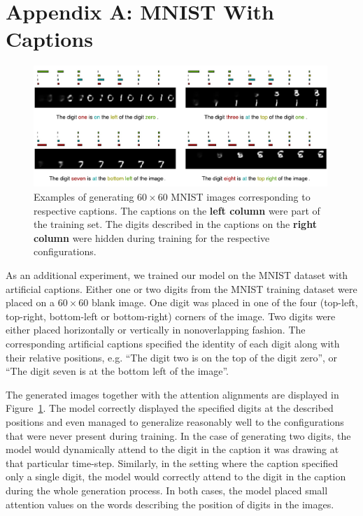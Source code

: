 

\section*{Appendix A: MNIST With Captions}

\begin{figure}[!t]
\captionsetup[subfigure]{labelformat=empty}
\begin{center}
\includegraphics[width=0.99\textwidth]{figures/new/mnist/test3.pdf}\quad
%
\end{center}
\caption{Examples of generating $60 \times 60$ MNIST images corresponding to respective captions. The captions on the \textbf{left column} were part of the training set. The digits described in the captions on the \textbf{right column} were hidden during training for the respective configurations.}
\label{fig:figmnist}
\vspace{-0.3cm}
\end{figure}

As an additional experiment, we trained our model on the MNIST dataset with artificial captions. Either one or two digits from the MNIST training dataset were placed on a $60 \times 60$ blank image. One digit was placed in one of the four (top-left, top-right, bottom-left or bottom-right) corners of the image. Two digits were either placed horizontally or vertically in nonoverlapping fashion. The corresponding artificial captions specified the 
identity of each digit along with their relative positions, e.g. ``The digit two is on the top  
of the digit zero'', or ``The digit seven is at the bottom left of the image''.  

The generated images together with the attention alignments are displayed in Figure~\ref{fig:figmnist}. The model correctly displayed the specified digits at the described positions and even managed to generalize 
reasonably well to the configurations that were never present during training.
In the case of generating two digits, the model would dynamically attend 
to the digit in the caption it was drawing at that particular time-step. 
Similarly, in the setting where the caption specified only a single digit, the model would correctly 
attend to the digit in the caption during the whole generation process. 
In both cases, the model placed small attention values on the words describing the position of digits in the images.

